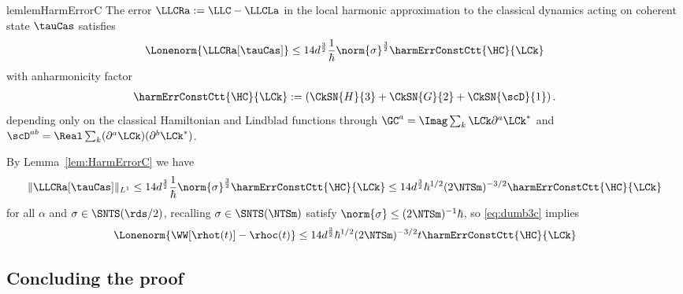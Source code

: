 \documentclass{article}
\numberwithin{equation}{section}
\begin{document}
\begin{restatable}{lem}{lemHarmErrorC}
	\label{lem:HarmErrorC}
	The error $\LLCRa := \LLC - \LLCLa$ in the local harmonic approximation to the classical dynamics acting on coherent state $\tauCas$ satisfies
	\begin{equation}
		\Lonenorm{\LLCRa [\tauCas]}
		\le 14 d^{\frac32}\frac{1}{\hbar}\norm{\sigma}^{\frac{3}{2}}  \harmErrConstCtt{\HC}{\LCk}
	\end{equation}
	with anharmonicity factor 
    \begin{align} \label{eq:harmErrConstCtt-def-lemma}
	\harmErrConstCtt{\HC}{\LCk} := 
    \left(\CkSN{H}{3} +  
     \CkSN{G}{2} + \CkSN{\scD}{1} 
     \right).
    \end{align}
     depending only on the classical Hamiltonian and Lindblad functions through $\GC^a=\Imag \sum_k \LCk \partial^a \LCk^*$ and $\scD^{ab} = \Real\sum_k (\partial^a \LCk)(\partial^b \LCk^*)$. 
\end{restatable}
By Lemma~\ref{lem:HarmErrorC} we have
\begin{align}
	\|\LLCRa [\tauCas]\|_{L^1} \le 14 d^{\frac32} \frac{1}{\hbar} \norm{\sigma}^{\frac{3}{2}}  \harmErrConstCtt{\HC}{\LCk} \leq  14
 d^{\frac32}
 \hbar^{1/2} (2\NTSm)^{-3/2}
 \harmErrConstCtt{\HC}{\LCk}
\end{align}
for all $\alpha$ and $\sigma\in\SNTS(\rds/2)$, recalling $\sigma\in\SNTS(\NTSm)$ satisfy $\norm{\sigma} \leq (2\NTSm)^{-1}\hbar$, so \eqref{eq:dumb3c} implies
\begin{align}\label{eq:Wrhot-rhoc}
	\Lonenorm{\WW[\rhot(t)]-\rhoc(t)} \le 14 d^{\frac32} 
 \hbar^{1/2} (2\NTSm)^{-3/2}t
 \harmErrConstCtt{\HC}{\LCk}
\end{align}


\subsection{Concluding the proof}
\end{document}
